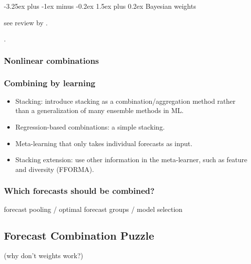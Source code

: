 \documentclass[11pt]{article}
\makeatletter
\renewcommand{\paragraph}{\@startsection{paragraph}{4}{0ex}%
   {-3.25ex plus -1ex minus -0.2ex}%
   {1.5ex plus 0.2ex}%
   {\normalfont\normalsize\bfseries}}
\makeatother
\begin{document}

\paragraph{Bayesian weights}

see review by \cite{Cheng2015-tp}.

\citep{Bunn1975-mg,Clemen1993-ey,Nowotarski2014-ev}.



\subsubsection{Nonlinear combinations}


\subsubsection{Combining by learning}
\begin{itemize}
 \item Stacking: introduce stacking as a combination/aggregation method rather than a generalization of many ensemble methods in ML.
 \item Regression-based combinations: a simple stacking.
 \item Meta-learning that only takes individual forecasts as input.
 \item Stacking extension: use other information in the meta-learner, such as feature and diversity (FFORMA).
\end{itemize}

\subsubsection{Which forecasts should be combined?}

forecast pooling / optimal forecast groups / model selection
\citep{Zhou2002-cg,Kourentzes2019-na}



\subsection{Forecast Combination Puzzle}
{\color{red} (why don't weights work?)}

\citep{Kang1986-kq,De_Menezes2000-vd,Genre2013-ut,Post2019-lv,Chan2018-jl,Lichtendahl2020-ut,Kourentzes2019-na}
\end{document}
